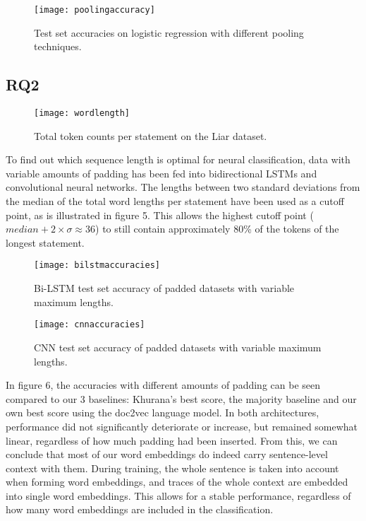 \begin{figure}[t]
    \centering
    \texttt{[image: poolingaccuracy]}
    \caption{Test set accuracies on logistic regression with different pooling techniques.}
\end{figure}

\subsection{RQ2}

\begin{figure}[b!]
    \centering
    \texttt{[image: wordlength]}
    \caption{Total token counts per statement on the Liar dataset.}
\end{figure}

To find out which sequence length is optimal for neural classification, data with variable amounts of padding has been fed into bidirectional LSTMs and convolutional neural networks.
The lengths between two standard deviations from the median of the total word lengths per statement have been used as a cutoff point, as is illustrated in figure 5. 
This allows the highest cutoff point (\(median + 2 \times \sigma \approx 36\)) to still contain approximately 80\% of the tokens of the longest statement.

\begin{figure}[b]
    \texttt{[image: bilstmaccuracies]}
    \caption{Bi-LSTM test set accuracy of padded datasets with variable maximum lengths.}
\end{figure}
    
\begin{figure}[b]
    \texttt{[image: cnnaccuracies]}
    \caption{CNN test set accuracy of padded datasets with variable maximum lengths.}
\end{figure}

In figure 6, the accuracies with different amounts of padding can be seen compared to our 3 baselines: Khurana's best score, the majority baseline and our own best score using the doc2vec language model.
In both architectures, performance did not significantly deteriorate or increase, but remained somewhat linear, regardless of how much padding had been inserted.
From this, we can conclude that most of our word embeddings do indeed carry sentence-level context with them.
During training, the whole sentence is taken into account when forming word embeddings, and traces of the whole context are embedded into single word embeddings.
This allows for a stable performance, regardless of how many word embeddings are included in the classification.

